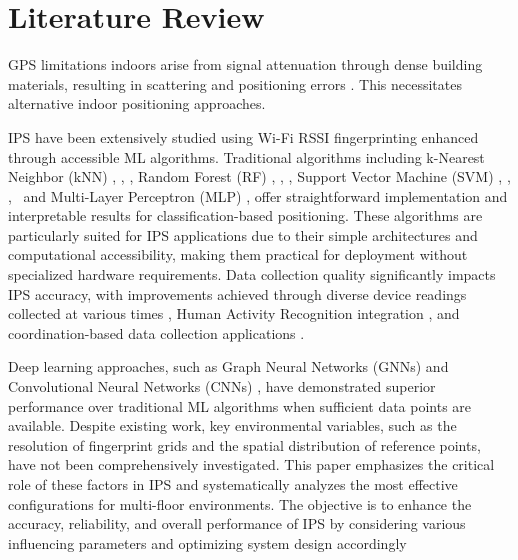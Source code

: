 \documentclass[runningheads]{llncs}
\begin{document}

\section{Literature Review}
GPS limitations indoors arise from signal attenuation through dense building materials, resulting in scattering and positioning errors \cite{bgp1}. This necessitates alternative indoor positioning approaches.

IPS have been extensively studied using Wi-Fi RSSI fingerprinting enhanced through accessible ML algorithms. Traditional algorithms including k-Nearest Neighbor (kNN) \cite{LRE1}, \cite{LRE2}, \cite{LRE6}, Random Forest (RF) \cite{LRE1}, \cite{LRE6}, \cite{LRE5}, Support Vector Machine (SVM) \cite{LRE1}, \cite{LRE2}, \cite{LRE6},~\cite{add1} and Multi-Layer Perceptron (MLP) \cite{LRE1}, \cite{LRE2} offer straightforward implementation and interpretable results for classification-based positioning. These algorithms are particularly suited for IPS applications due to their simple architectures and computational accessibility, making them practical for deployment without specialized hardware requirements. Data collection quality significantly impacts IPS accuracy, with improvements achieved through diverse device readings collected at various times \cite{LRE3}, Human Activity Recognition integration \cite{LRE4}, and coordination-based data collection applications \cite{LRE7}.

Deep learning approaches, such as Graph Neural Networks (GNNs) \cite{LRE2} and Convolutional Neural Networks (CNNs) \cite{LRE4}, have demonstrated superior performance over traditional ML algorithms when sufficient data points are available. Despite existing work, key environmental variables, such as the resolution of fingerprint grids and the spatial distribution of reference points, have not been comprehensively investigated. This paper emphasizes the critical role of these factors in IPS and systematically analyzes the most effective configurations for multi-floor environments. The objective is to enhance the accuracy, reliability, and overall performance of IPS by considering various influencing parameters and optimizing system design accordingly

\end{document}

